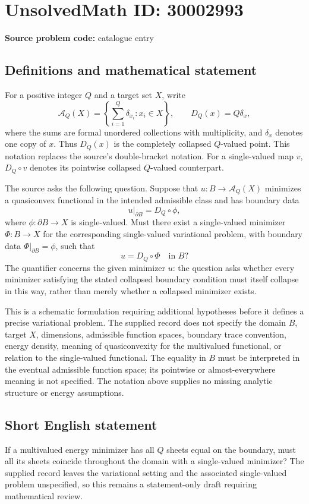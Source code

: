 \documentclass[11pt]{article}
\begin{document}
\section*{UnsolvedMath ID: 30002993}
\textbf{Source problem code:} catalogue entry
\subsection{Definitions and mathematical statement}
For a positive integer \(Q\) and a target set \(X\), write
\[
\mathcal A_Q(X)=\left\{\sum_{i=1}^{Q}\delta_{x_i}:x_i\in X\right\},
\qquad D_Q(x)=Q\delta_x,
\]
where the sums are formal unordered collections with multiplicity, and \(\delta_x\) denotes one copy of \(x\). Thus \(D_Q(x)\) is the completely collapsed \(Q\)-valued point. This notation replaces the source's double-bracket notation. For a single-valued map \(v\), \(D_Q\circ v\) denotes its pointwise collapsed \(Q\)-valued counterpart.

The source asks the following question. Suppose that \(u:B\to\mathcal A_Q(X)\) minimizes a quasiconvex functional in the intended admissible class and has boundary data
\[
u|_{\partial B}=D_Q\circ\phi,
\]
where \(\phi:\partial B\to X\) is single-valued. Must there exist a single-valued minimizer \(\Phi:B\to X\) for the corresponding single-valued variational problem, with boundary data \(\Phi|_{\partial B}=\phi\), such that
\[
u=D_Q\circ\Phi\quad\text{in }B?
\]
The quantifier concerns the given minimizer \(u\): the question asks whether every minimizer satisfying the stated collapsed boundary condition must itself collapse in this way, rather than merely whether a collapsed minimizer exists.

This is a schematic formulation requiring additional hypotheses before it defines a precise variational problem. The supplied record does not specify the domain \(B\), target \(X\), dimensions, admissible function spaces, boundary trace convention, energy density, meaning of quasiconvexity for the multivalued functional, or relation to the single-valued functional. The equality in \(B\) must be interpreted in the eventual admissible function space; its pointwise or almost-everywhere meaning is not specified. The notation above supplies no missing analytic structure or energy assumptions.
\subsection{Short English statement}
If a multivalued energy minimizer has all \(Q\) sheets equal on the boundary, must all its sheets coincide throughout the domain with a single-valued minimizer? The supplied record leaves the variational setting and the associated single-valued problem unspecified, so this remains a statement-only draft requiring mathematical review.
\end{document}
